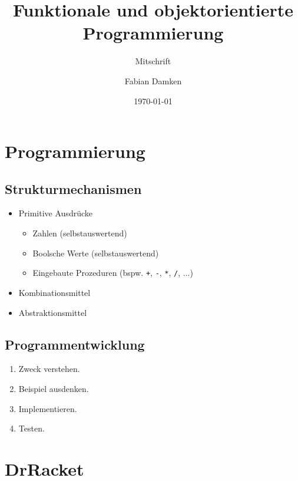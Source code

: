 \documentclass[12pt]{scrreprt}
\title{Funktionale und objektorientierte Programmierung}
\subtitle{Mitschrift}
\author{Fabian Damken}
\date{\today}
\begin{document}
    \maketitle
    \tableofcontents

    \chapter{Programmierung}
        \label{c:programmierung}

        \section{Strukturmechanismen}
            \label{s:programmierung_strukt}

            \begin{itemize}
                \item
                    Primitive Ausdrücke
                    \begin{itemize}
                        \item Zahlen (selbstauswertend)
                        \item Boolsche Werte (selbstauswertend)
                        \item Eingebaute Prozeduren (bspw. \texttt{+}, \texttt{-}, \texttt{*}, \texttt{/}, ...)
                    \end{itemize}
                \item Kombinationsmittel
                \item Abstraktionsmittel
            \end{itemize}


        \section{Programmentwicklung}
            \label{s:programmierung_entwicklung}

            \begin{enumerate}
                \item Zweck verstehen.
                \item Beispiel ausdenken.
                \item Implementieren.
                \item Testen.
            \end{enumerate}


    \chapter{DrRacket}
        \label{c:drracket}
\end{document}
